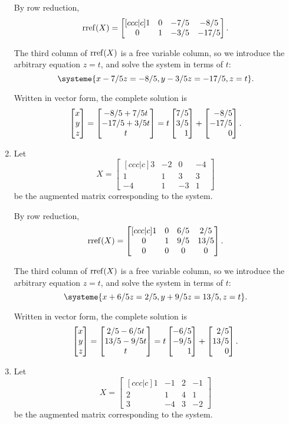 \begin{exercises}
\begin{problist}
\begin{solution}
\begin{enumerate}
				By row reduction,
				\[
					\operatorname{rref}(X)=
					\begin{bmatrix}[ccc|c]
						1 & 0 & -7/5 & -8/5\\
						0 & 1 & -3/5 & -17/5
					\end{bmatrix}.
				\]
				
				The third column of $\operatorname{rref}(X)$ is a free variable column, so
				we introduce the arbitrary equation $z=t$, and solve the system
				in terms of $t$:
				\[
					\systeme{x-7/5z=-8/5,y-3/5z=-17/5,z=t}.
				\]
				
				Written in vector form, the complete solution is
				\[
					\mat{x\\y\\z} = \matc{-8/5+7/5t\\-17/5+3/5t\\t} = t\mat{7/5\\3/5\\1}+\mat{-8/5\\-17/5\\0}.
				\]
				\item 
				Let
				\[
					X=
					\begin{bmatrix}[ccc|c]
						3 & -2 & 0 & -4\\
						1 & 1 & 3 & 3\\
						-4 & 1 & -3 & 1
					\end{bmatrix}
				\]
				be the augmented matrix corresponding to the system.
				
				By row reduction,
				\[
					\operatorname{rref}(X)=
					\begin{bmatrix}[ccc|c]
						1 & 0 & 6/5 & 2/5\\
						0 & 1 & 9/5 & 13/5\\
						0 & 0 & 0 & 0
					\end{bmatrix}.
				\]
				
				The third column of $\operatorname{rref}(X)$ is a free variable column, so
				we introduce the arbitrary equation $z=t$, and solve the system
				in terms of $t$:
				\[
					\systeme{x+6/5z=2/5,y+9/5z=13/5,z=t}.
				\]
				
				Written in vector form, the complete solution is
				\[
					\mat{x\\y\\z} = \matc{2/5-6/5t\\13/5-9/5t\\t} = t\mat{-6/5\\-9/5\\1}+\mat{2/5\\13/5\\0}.
				\]
				\item 
				Let
				\[
					X=
					\begin{bmatrix}[ccc|c]
						1 & -1 & 2 & -1\\
						2 & 1 & 4 & 1\\
						3 & -4 & 3 & -2
					\end{bmatrix}
				\]
				be the augmented matrix corresponding to the system.
				

\end{enumerate}
\end{solution}
\end{problist}
\end{exercises}
